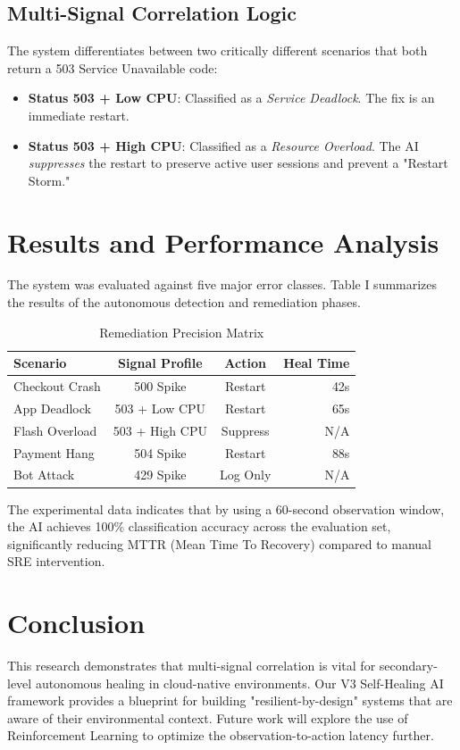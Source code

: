 \documentclass[conference]{IEEEtran}
\begin{document}
\subsection{Multi-Signal Correlation Logic}
The system differentiates between two critically different scenarios that both return a 503 Service Unavailable code:
\begin{itemize}
    \item \textbf{Status 503 + Low CPU}: Classified as a \textit{Service Deadlock}. The fix is an immediate restart.
    \item \textbf{Status 503 + High CPU}: Classified as a \textit{Resource Overload}. The AI \textit{suppresses} the restart to preserve active user sessions and prevent a "Restart Storm."
\end{itemize}

\section{Results and Performance Analysis}
The system was evaluated against five major error classes. Table I summarizes the results of the autonomous detection and remediation phases.

\begin{table}[htbp]
\caption{Remediation Precision Matrix}
\begin{center}
\begin{tabular}{|l|c|c|r|}
\hline
\textbf{Scenario}&\textbf{Signal Profile}&\textbf{Action}&\textbf{Heal Time} \\
\hline
Checkout Crash & 500 Spike & Restart & 42s \\
App Deadlock & 503 + Low CPU & Restart & 65s \\
Flash Overload & 503 + High CPU & Suppress & N/A \\
Payment Hang & 504 Spike & Restart & 88s \\
Bot Attack & 429 Spike & Log Only & N/A \\
\hline
\end{tabular}
\end{center}
\end{table}

The experimental data indicates that by using a 60-second observation window, the AI achieves 100\% classification accuracy across the evaluation set, significantly reducing MTTR (Mean Time To Recovery) compared to manual SRE intervention.

\section{Conclusion}
This research demonstrates that multi-signal correlation is vital for secondary-level autonomous healing in cloud-native environments. Our V3 Self-Healing AI framework provides a blueprint for building "resilient-by-design" systems that are aware of their environmental context. Future work will explore the use of Reinforcement Learning to optimize the observation-to-action latency further.
\end{document}
